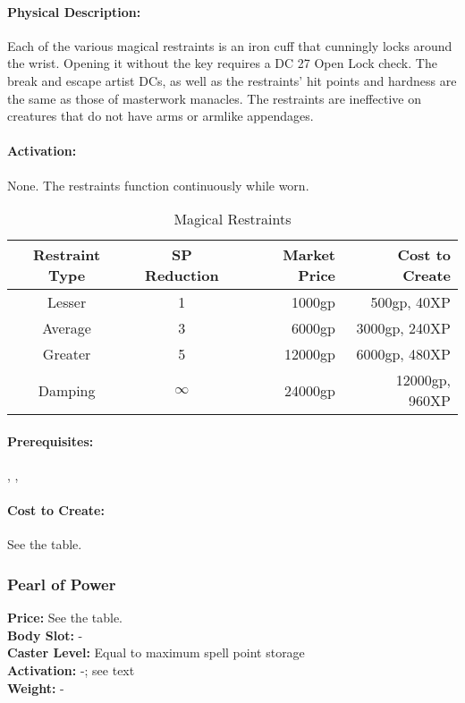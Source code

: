 \paragraph{Physical Description:} Each of the various magical restraints is an iron cuff that cunningly locks around the wrist. Opening it without the key requires a DC 27 Open Lock check. The break and escape artist DCs, as well as the restraints' hit points and hardness are the same as those of masterwork manacles. The restraints are ineffective on creatures that do not have arms or armlike appendages.

\paragraph{Activation:} None. The restraints function continuously while worn.

\begin{table*}
\caption{Magical Restraints}
\label{tab:MagicalRestraints}
\centering
\begin{tabular}{ccrr}
\toprule
\textbf{Restraint Type}&\textbf{SP Reduction}&\textbf{Market Price}&\textbf{Cost to Create}\\
\midrule
Lesser&1&1000gp&500gp, 40XP\\
Average&3&6000gp&3000gp, 240XP\\
Greater&5&12000gp&6000gp, 480XP\\
Damping&$\infty$&24000gp&12000gp, 960XP\\
\bottomrule
\end{tabular}
\end{table*}

\paragraph{Prerequisites:} , , 

\paragraph{Cost to Create:} See the  table.


\subsubsection{Pearl of Power}
\label{Item:PearlOfPower}
\textbf{Price:} See the  table.\\
\textbf{Body Slot:} -\\
\textbf{Caster Level:} Equal to maximum spell point storage\\
\textbf{Activation:} -; see text\\
\textbf{Weight:} -

